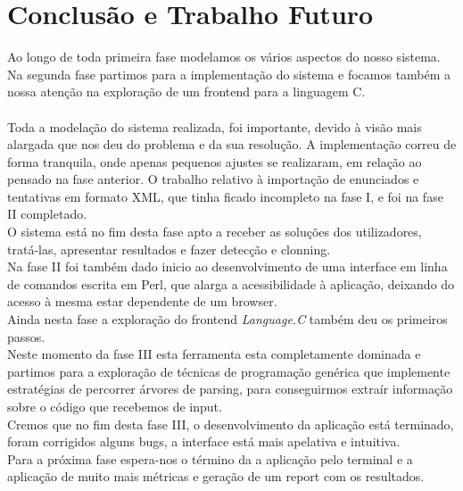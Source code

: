 \chapter{Conclusão e Trabalho Futuro}\label{chap con} 
Ao longo de toda primeira fase modelamos os vários aspectos do nosso sistema. Na segunda fase partimos para a implementação do
sistema e focamos também a nossa atenção na exploração de um frontend para a linguagem C.\\
\\
Toda a modelação do sistema realizada, foi importante, devido à visão mais alargada que nos deu do problema e da sua resolução.
A implementação correu de forma tranquila, onde apenas pequenos ajustes se realizaram, em relação ao pensado na fase anterior.
O trabalho relativo à importação de enunciados e tentativas em formato XML, que tinha ficado incompleto na fase I, e foi na fase II
completado.\\
O sistema está no fim desta fase apto a receber as soluções dos utilizadores, tratá-las, apresentar resultados e fazer detecção e clonning.\\
Na fase II foi também dado inicio ao desenvolvimento de uma interface em linha de comandos escrita em Perl, que alarga a acessibilidade à
aplicação, deixando do acesso à mesma estar dependente de um browser.\\
Ainda nesta fase a exploração do frontend \textit{Language.C} também deu os primeiros passos.\\
Neste momento da fase III esta ferramenta esta completamente dominada e partimos para a exploração de técnicas de programação genérica que
implemente estratégias de percorrer árvores de parsing, para conseguirmos extraír informação sobre o código que recebemos de input.
\\
Cremos que no fim desta fase III, o desenvolvimento da aplicação está terminado, foram corrigidos alguns bugs, a
interface está mais apelativa e intuitiva.\\

Para a próxima fase espera-nos o término da a aplicação pelo terminal e a aplicação de muito mais métricas e geração de um report com os resultados.
